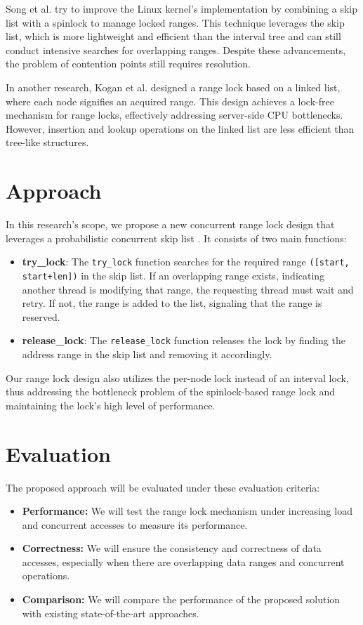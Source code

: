 Song et al. \parencite{song2013parallelizing} try to improve the Linux kernel's implementation by combining a skip list with a spinlock to manage locked ranges. This technique leverages the skip list, which is more lightweight and efficient than the interval tree and can still conduct intensive searches for overlapping ranges. Despite these advancements, the problem of contention points still requires resolution.

In another research, Kogan et al. \cite{kogan2020scalable} designed a range lock based on a linked list, where each node signifies an acquired range. This design achieves a lock-free mechanism for range locks, effectively addressing server-side CPU bottlenecks. However, insertion and lookup operations on the linked list are less efficient than tree-like structures. 

\newpage

\section{Approach}
In this research's scope, we propose a new concurrent range lock design that leverages a probabilistic concurrent skip list \parencite{herlihy2006provably, herlihy2020art}. It consists of two main functions:
\begin{itemize}
    \item \textbf{try\_lock}: The \texttt{try\_lock} function searches for the required range \texttt{([start, start+len])} in the skip list. If an overlapping range exists, indicating another thread is modifying that range, the requesting thread must wait and retry. If not, the range is added to the list, signaling that the range is reserved.
    \item \textbf{release\_lock}: The \texttt{release\_lock} function releases the lock by finding the address range in the skip list and removing it accordingly.
\end{itemize} 

Our range lock design also utilizes the per-node lock instead of an interval lock, thus addressing the bottleneck problem of the spinlock-based range lock and maintaining the lock's high level of performance. 

\section{Evaluation}
The proposed approach will be evaluated under these evaluation criteria:
\begin{itemize}
    \item \textbf{Performance:} We will test the range lock mechanism under increasing load and concurrent accesses to measure its performance.
    \item \textbf{Correctness:} We will ensure the consistency and correctness of data accesses, especially when there are overlapping data ranges and concurrent operations.
    \item \textbf{Comparison:} We will compare the performance of the proposed solution with existing state-of-the-art approaches.
\end{itemize}

